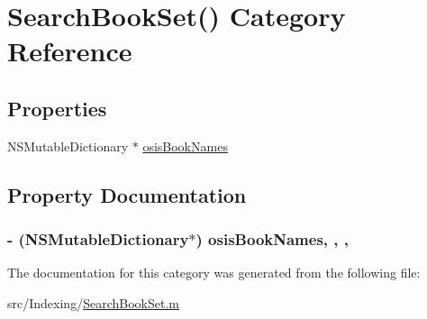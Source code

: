 \hypertarget{category_search_book_set_07_08}{\section{Search\-Book\-Set() Category Reference}
\label{category_search_book_set_07_08}
}
\subsection*{Properties}
\begin{DoxyCompactItemize}
\item 
N\-S\-Mutable\-Dictionary $\ast$ \hyperlink{category_search_book_set_07_08_a0c8f91395667336825fcaa94c4dd1140}{osis\-Book\-Names}
\end{DoxyCompactItemize}


\subsection{Property Documentation}
\hypertarget{category_search_book_set_07_08_a0c8f91395667336825fcaa94c4dd1140}{
\subsubsection[{osis\-Book\-Names}]{\setlength{\rightskip}{0pt plus 5cm}-\/ (N\-S\-Mutable\-Dictionary$\ast$) osis\-Book\-Names\hspace{0.3cm}{\ttfamily [read]}, {\ttfamily [write]}, {\ttfamily [atomic]}, {\ttfamily [retain]}}}\label{category_search_book_set_07_08_a0c8f91395667336825fcaa94c4dd1140}


The documentation for this category was generated from the following file\-:\begin{DoxyCompactItemize}
\item 
src/\-Indexing/\hyperlink{_search_book_set_8m}{Search\-Book\-Set.\-m}\end{DoxyCompactItemize}
